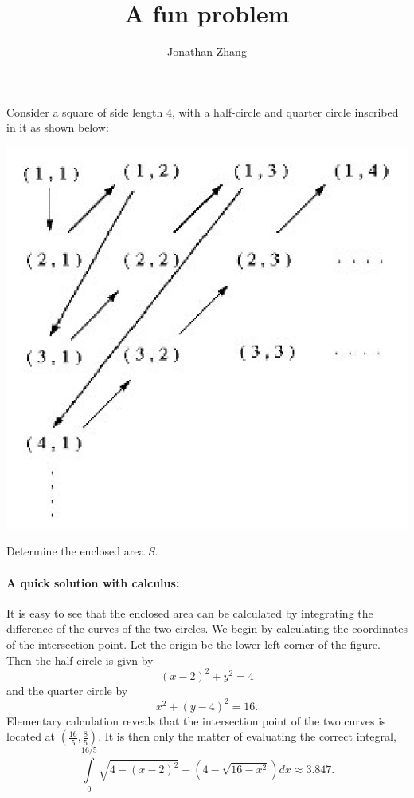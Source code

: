 \documentclass[letterpaper,twoside,11pt]{article}
\theoremstyle{mystyle}
\begin{document}
\title{\vspace{-2\baselineskip} 
A fun problem
}
\author{Jonathan Zhang  }
\date{}
\maketitle


Consider a square of side length $4$, with a half-circle and quarter circle inscribed in it as shown below: 

\begin{center}
  \includegraphics*[scale=0.25]{Untitled.png}
\end{center}
Determine the enclosed area $S$. 

\paragraph*{A quick solution with calculus:}
It is easy to see that the enclosed area can be calculated by integrating the difference of the curves of the two circles. 
We begin by calculating the coordinates of the intersection point. Let the origin be the lower left corner of the figure. Then the half circle is givn by 
\[(x-2)^2 + y^2 = 4\]
and the quarter circle by 
\[x^2 + (y-4)^2 = 16. \]
Elementary calculation reveals that the intersection point of the two curves is located at $\left(\frac{16}{5}, \frac{8}{5}\right)$. It is then only the matter of evaluating the correct integral, 
\[\int\limits_0^{16/5} \sqrt{4-(x-2)^2} - (4-\sqrt{16-x^2}) dx \approx 3.847. \]
\end{document}
